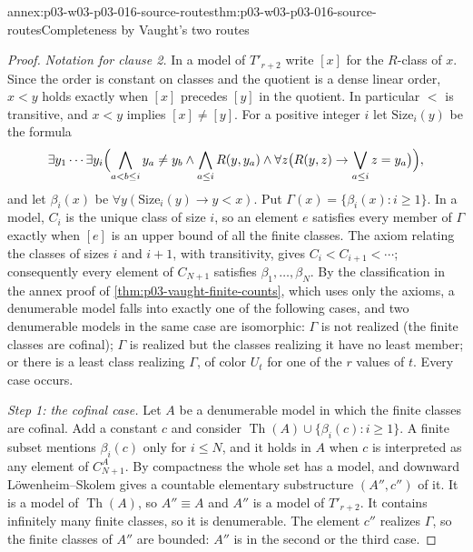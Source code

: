 \begin{annexitem}{annex:p03-w03-p03-016-source-routes}{thm:p03-w03-p03-016-source-routes}{Completeness by Vaught's two routes}
\begin{proof}
\emph{Notation for clause 2.} In a model of \(T'_{r+2}\) write \([x]\)
for the \(R\)-class of \(x\). Since the order is constant on classes and
the quotient is a dense linear order, \(x<y\) holds exactly when
\([x]\) precedes \([y]\) in the quotient. In particular \(<\) is
transitive, and \(x<y\) implies \([x]\ne[y]\). For a positive integer
\(i\) let \(\mathrm{Size}_i(y)\) be the formula
\[
 \exists y_1\cdots\exists y_i\Bigl(\bigwedge_{a<b\le i}y_a\ne y_b
 \wedge\bigwedge_{a\le i}R(y,y_a)
 \wedge\forall z\bigl(R(y,z)\rightarrow\bigvee_{a\le i}z=y_a\bigr)\Bigr),
\]
and let \(\beta_i(x)\) be \(\forall y(\mathrm{Size}_i(y)\rightarrow y<x)\).
Put \(\Gamma(x)=\{\beta_i(x):i\ge1\}\). In a model, \(C_i\) is the unique
class of size \(i\), so an element \(e\) satisfies every member of
\(\Gamma\) exactly when \([e]\) is an upper bound of all the finite classes.
The axiom relating the classes of sizes \(i\) and \(i+1\), with
transitivity, gives \(C_i<C_{i+1}<\cdots\); consequently every element of
\(C_{N+1}\) satisfies \(\beta_1,\ldots,\beta_N\). By the classification in
the annex proof of \cref{thm:p03-vaught-finite-counts}, which uses only the
axioms, a denumerable model falls into exactly one of the following cases,
and two denumerable models in the same case are isomorphic: \(\Gamma\) is
not realized (the finite classes are cofinal); \(\Gamma\) is realized but
the classes realizing it have no least member; or there is a least class
realizing \(\Gamma\), of color \(U_t\) for one of the \(r\) values of
\(t\). Every case occurs.

\emph{Step 1: the cofinal case.} Let \(A\) be a denumerable model in which
the finite classes are cofinal. Add a constant \(c\) and consider
\(\operatorname{Th}(A)\cup\{\beta_i(c):i\ge1\}\). A finite subset mentions
\(\beta_i(c)\) only for \(i\le N\), and it holds in \(A\) when \(c\) is
interpreted as any element of \(C_{N+1}^A\). By compactness the whole set
has a model, and downward L\"owenheim--Skolem gives a countable elementary
substructure \((A'',c'')\) of it. It is a model of
\(\operatorname{Th}(A)\), so \(A''\equiv A\) and \(A''\) is a model of
\(T'_{r+2}\). It contains infinitely many finite classes, so it is
denumerable. The element \(c''\) realizes \(\Gamma\), so the finite classes
of \(A''\) are bounded: \(A''\) is in the second or the third case.


\end{proof}
\end{annexitem}
